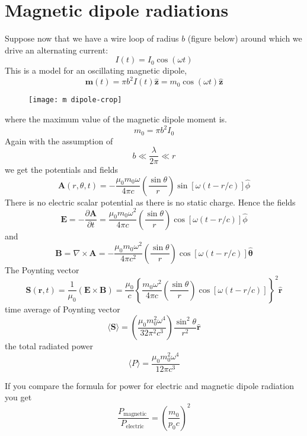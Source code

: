 \section{Magnetic dipole radiations}
Suppose now that we have a wire loop of radius $b$ (figure below) around which we drive an alternating current:
$$I(t)=I_{0} \cos (\omega t)$$
This is a model for an oscillating magnetic dipole,
$$
\mathbf{m}(t)=\pi b^{2} I(t) \hat{\mathbf{z}}=m_{0} \cos (\omega t) \hat{\mathbf{z}}
$$
\begin{figure}[H]
	\centering
	\texttt{[image: m dipole-crop]}
	\caption{}
	\label{}
\end{figure}
where the maximum value of the magnetic dipole moment is.\\
$$m_{0}=\pi b^{2} I_{0}$$
Again with the assumption of
$$
b \ll \frac{\lambda}{2 \pi} \ll r
$$
 we get the potentials and fields \\
 $$\mathbf{A}(r, \theta, t)=-\frac{\mu_{0} m_{0} \omega}{4 \pi c}\left(\frac{\sin \theta}{r}\right) \sin [\omega(t-r / c)] \hat{\phi}$$
 There is no electric scalar potential as there is no static charge. Hence the fields\\
 $$\mathbf{E}=-\frac{\partial \mathbf{A}}{\partial t}=\frac{\mu_{0} m_{0} \omega^{2}}{4 \pi c}\left(\frac{\sin \theta}{r}\right) \cos [\omega(t-r / c)] \hat{\phi}$$
 and
 $$\mathbf{B}=\nabla \times \mathbf{A}=-\frac{\mu_{0} m_{0} \omega^{2}}{4 \pi c^{2}}\left(\frac{\sin \theta}{r}\right) \cos [\omega(t-r / c)] \hat{\boldsymbol{\theta}}$$
The Poynting vector 
$$\mathbf{S}(\mathbf{r}, t)=\frac{1}{\mu_{0}}(\mathbf{E} \times \mathbf{B})=\frac{\mu_{0}}{c}\left\{\frac{m_{0} \omega^{2}}{4 \pi c}\left(\frac{\sin \theta}{r}\right) \cos [\omega(t-r / c)]\right\}^{2} \hat{\mathbf{r}}$$
time average of Poynting vector
$$
\langle\mathbf{S}\rangle=\left(\frac{\mu_{0} m_{0}^{2} \omega^{4}}{32 \pi^{2} c^{3}}\right) \frac{\sin ^{2} \theta}{r^{2}} \hat{\mathbf{r}}
$$
the total radiated power
$$
\langle P\rangle=\frac{\mu_{0} m_{0}^{2} \omega^{4}}{12 \pi c^{3}}
$$
\begin{note}
	If you compare the formula for power for electric and magnetic dipole radiation you get
	$$\frac{P_{\text {magnetic }}}{P_{\text {electric }}}=\left(\frac{m_{0}}{p_{0} c}\right)^{2}$$
\end{note}
